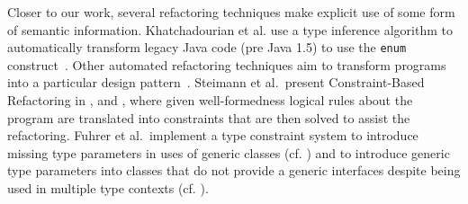 \documentclass[10pt,conference]{IEEEtran}
\begin{document}
Closer to our work, several refactoring techniques make explicit use of some form of semantic information.
Khatchadourian et al. use a type inference algorithm to automatically transform legacy Java code (pre Java 1.5) to use the \texttt{enum} construct~\cite{sawin}.
Other automated refactoring techniques aim to transform programs into a particular design pattern~\cite{chris,bae}.
%
%
%
%
Steimann et al.~present Constraint-Based Refactoring in \cite{Steimann2011},
\cite{Steimann2012Pilgrim} and \cite{Steimann2011KollePilgrim},
where given well-formedness logical rules about the program are translated into constraints that are then solved to assist the refactoring.
%
Fuhrer et al.~implement a type constraint system to introduce missing type
parameters in uses of generic classes (cf. \cite{DBLP:conf/ecoop/FuhrerTKDK05})
and to introduce generic type parameters into classes that do not provide
a generic interfaces despite being used in multiple type contexts
(cf. \cite{DBLP:conf/icse/KiezunETF07}).
%
%
\end{document}

